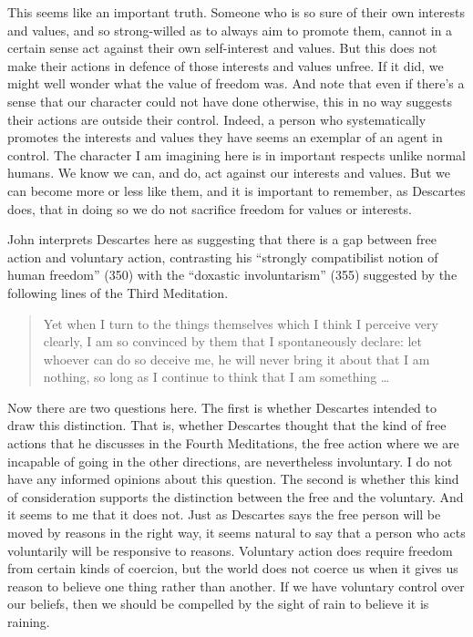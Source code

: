 \noindent This seems like an important truth. Someone who is so sure of their own interests and values, and so strong-willed as to always aim to promote them, cannot in a certain sense act against their own self-interest and values. But this does not make their actions in defence of those interests and values unfree. If it did, we might well wonder what the value of freedom was. And note that even if there's a sense that our character could not have done otherwise, this in no way suggests their actions are outside their control. Indeed, a person who systematically promotes the interests and values they have seems an exemplar of an agent in control. The character I am imagining here is in important respects unlike normal humans. We know we can, and do, act against our interests and values. But we can become more or less like them, and it is important to remember, as Descartes does, that in doing so we do not sacrifice freedom for values or interests.

John \citet{Cottingham2002} interprets Descartes here as suggesting that there is a gap between free action and voluntary action, contrasting his ``strongly compatibilist notion of human freedom'' (350) with the ``doxastic involuntarism'' (355) suggested by the following lines of the Third Meditation.

\begin{quote}
Yet when I turn to the things themselves which I think I perceive very clearly, I am so convinced by them that I spontaneously declare: let whoever can do so deceive me, he will never bring it about that I am nothing, so long as I continue to think that I am something {\dots} \cite[25]{DescartesMeditations} \end{quote}

\noindent Now there are two questions here. The first is whether Descartes intended to draw this distinction. That is, whether Descartes thought that the kind of free actions that he discusses in the Fourth Meditations, the free action where we are incapable of going in the other directions, are nevertheless involuntary. I do not have any informed opinions about this question. The second is whether this kind of consideration supports the distinction between the free and the voluntary. And it seems to me that it does not. Just as Descartes says the free person will be moved by reasons in the right way, it seems natural to say that a person who acts voluntarily will be responsive to reasons. Voluntary action does require freedom from certain kinds of coercion, but the world does not coerce us when it gives us reason to believe one thing rather than another. If we have voluntary control over our beliefs, then we should be compelled by the sight of rain to believe it is raining.

